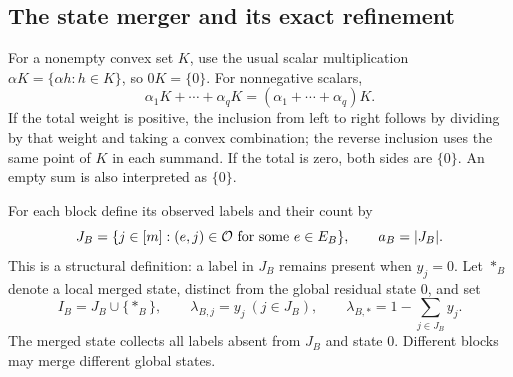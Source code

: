 \subsection{The state merger and its exact refinement}\label{subsec:state-merger}
For a nonempty convex set $K$, use the usual scalar multiplication
$\alpha K=\{\alpha h:h\in K\}$, so $0K=\{0\}$. For nonnegative scalars,
\begin{equation}\label{eq:homothetic-merger}
 \alpha_1K+\cdots+\alpha_qK
       =(\alpha_1+\cdots+\alpha_q)K.
\end{equation}
If the total weight is positive, the inclusion from left to right follows
by dividing by that weight and taking a convex combination; the reverse
inclusion uses the same point of $K$ in each summand. If the total is zero,
both sides are $\{0\}$. An empty sum is also interpreted as $\{0\}$.

For each block define its observed labels and their count by
\begin{equation}\label{eq:observed-labels}
 J_B=\{j\in[m]: (e,j)\in\mathcal O\text{ for some }e\in E_B\},
 \qquad a_B=|J_B|.
\end{equation}
This is a structural definition: a label in $J_B$ remains present when
$y_j=0$. Let $*_B$ denote a local merged state, distinct from the global
residual state $0$, and set
\begin{equation}\label{eq:merged-weight}
 I_B=J_B\cup\{*_B\},\qquad
 \lambda_{B,j}=y_j\ (j\in J_B),\qquad
 \lambda_{B,*}=1-\sum_{j\in J_B}y_j.
\end{equation}
The merged state collects all labels absent from $J_B$ and state $0$.
Different blocks may merge different global states.

